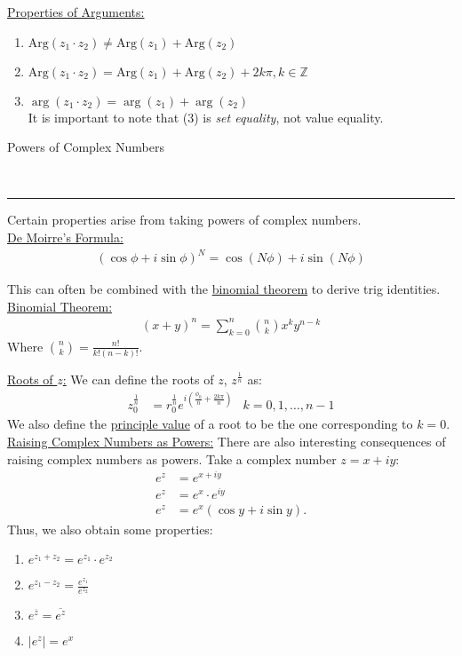\documentclass{article}
\newcommand{\header}[1]{\begin{large}\noindent #1\end{large}\\\rule{\textwidth}{0.5pt}}
\newcommand{\gap}{\medskip\\}
\newcommand{\sheader}[1]{\underline{#1:}}
\newcommand{\ds}{\displaystyle}
\newcommand{\Arg}{\textrm{Arg}}
\begin{document}
    \sheader{Properties of Arguments}
    \begin{enumerate}
        \item $\Arg(z_1 \cdot z_2) \neq \Arg(z_1) + \Arg(z_2)$
        \item $\Arg(z_1 \cdot z_2) = \Arg(z_1) + \Arg(z_2) + 2k\pi, k \in \mathbb{Z}$
        \item $\arg(z_1 \cdot z_2) = \arg(z_1) + \arg(z_2)$
        \gap
        It is important to note that (3) is \textit{set equality}, not value equality.
    \end{enumerate}

    \header{Powers of Complex Numbers}
    Certain properties arise from taking powers of complex numbers.
    \gap
    \sheader{De Moirre's Formula}
    \begin{align*}
        (\cos \phi + i \sin \phi)^N = \cos(N \phi) + i\sin(N \phi)
    \end{align*}

    This can often be combined with the \underline{binomial theorem} to derive 
    trig identities.
    \gap
    \sheader{Binomial Theorem}
    \begin{align*}
        (x + y)^n = \sum_{k = 0}^n \binom{n}{k} x^k y^{n-k}
    \end{align*}
    Where $\ds \binom{n}{k} = \frac{n!}{k!(n-k)!}$.

    \sheader{Roots of $z$}
    We can define the roots of $z$, $z^{\frac{1}{n}}$ as:
    \begin{align*}
        z_0^{\frac{1}{n}} &= r_0^{\frac{1}{n}}e^{i\left(\frac{\phi_0}{n} + \frac{2k\pi}{n}\right)} & k = 0, 1, \ldots , n-1
    \end{align*}
    We also define the \underline{principle value} of a root to be the one corresponding 
    to $k = 0$.
    \gap
    \sheader{Raising Complex Numbers as Powers} There are also interesting consequences
    of raising complex numbers as powers. Take a complex number $z = x + iy$:
    \begin{align*}
        e^z &= e^{x + iy}\\
        e^z &= e^{x} \cdot e^{iy}\\
        e^z &= e^x(\cos y + i\sin y).
    \end{align*}
    Thus, we also obtain some properties:
    \begin{enumerate}
        \item $\ds e^{z_1 + z_2} = e^{z_1}\cdot e^{z_2}$
        \item $\ds e^{z_1 - z_2} = \frac{e^{z_1}}{e^{z_2}}$
        \item $\ds e^{\overline{z}} = \overline{e^z}$
        \item $|e^z| = e^x$
    \end{enumerate}
\end{document}
